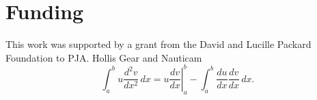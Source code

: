 \section{Funding}
\label{funding} 
This work was supported by a grant from the David and Lucille Packard Foundation to PJA. Hollis Gear and Nauticam 
\begin{equation}
\label{eqn:drag}
	\int_a^bu\frac{d^2v}{dx^2}\,dx
	=\left.u\frac{dv}{dx}\right|_a^b
	-\int_a^b\frac{du}{dx}\frac{dv}{dx}\,dx.
\end{equation}
